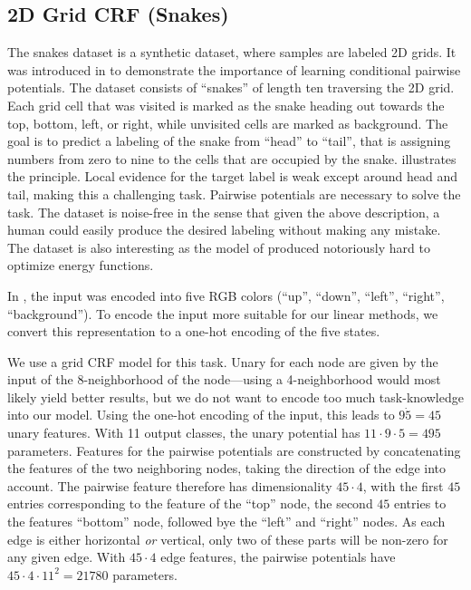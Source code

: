\subsection{2D Grid CRF (Snakes)}
The snakes dataset is a synthetic dataset, where samples are labeled 2D grids.
It was introduced in \citet{nowozin2011decision} to demonstrate the importance
of learning conditional pairwise potentials. The dataset consists of ``snakes''
of length ten traversing the 2D grid. Each grid cell that was visited is marked
as the snake heading out towards the top, bottom, left, or right, while
unvisited cells are marked as background.  The goal is to predict a labeling of
the snake from ``head'' to ``tail'', that is assigning numbers from zero to
nine to the cells that are occupied by the snake.   illustrates the
principle.
Local evidence for the target label is weak except
around head and tail, making this a challenging task. Pairwise potentials are necessary to solve the
task. The dataset is noise-free in the sense that given the above description, a
human could easily produce the desired labeling without making any mistake.
The dataset is also interesting as the model of \citet{nowozin2011decision} produced
notoriously hard to optimize energy functions.

In \citet{nowozin2011decision}, the input was encoded into five RGB colors
(``up'', ``down'', ``left'', ``right'', ``background'').  To encode the input
more suitable for our linear methods, we convert this representation to a
one-hot encoding of the five states.

We use a grid CRF model for this task. Unary for each node are given by the
input of the 8-neighborhood of the node---using a 4-neighborhood would most
likely yield better results, but we do not want to encode too much
task-knowledge into our model.
Using the one-hot encoding of the input, this leads to $9 \dot 5 = 45$ unary features.
With 11 output classes, the unary potential has $11 \cdot 9 \cdot 5=495$ parameters.
Features for the pairwise potentials are constructed by concatenating the features
of the two neighboring nodes, taking the direction of the edge into account.
The pairwise feature therefore has dimensionality $45 \cdot 4$, with the first
$45$ entries corresponding to the feature of the ``top'' node, the second $45$
entries to the features ``bottom'' node, followed bye the ``left'' and
``right'' nodes. As each edge is either horizontal \emph{or} vertical, only two
of these parts will be non-zero for any given edge.  With $45 \cdot 4$ edge
features, the pairwise potentials have $45 \cdot 4 \cdot 11^2 =21780$ parameters.


